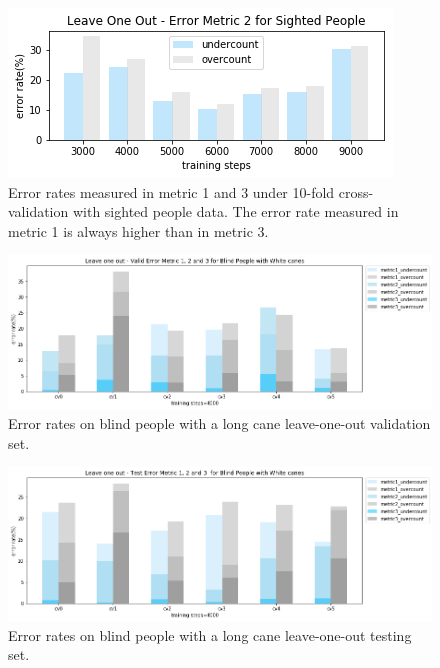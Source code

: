 \documentclass[11pt]{article}
\begin{document}
\begin{figure}[ht]
\centering
\includegraphics[scale=0.55]{error_metric_2_na_step}
\caption{Error rates measured in metric 1 and 3 under 10-fold cross-validation with sighted people data. The error rate measured in metric 1 is always higher than in metric 3.}
\label{fig:error_metric_2_na_step}
\end{figure}


\begin{figure}[ht]
\centering
\includegraphics[scale=0.5]{error_metric_wc_10fold_valid4000}
\caption{Error rates on blind people with a long cane leave-one-out validation set.}
\label{fig:error_metric_wc_10fold_valid4000}
\end{figure}


\begin{figure}[ht]
\centering
\includegraphics[scale=0.5]{error_metric_wc_10fold_test4000}
\caption{Error rates on blind people with a long cane leave-one-out testing set.}
\label{fig:error_metric_wc_10fold_test4000}
\end{figure}
\end{document}
